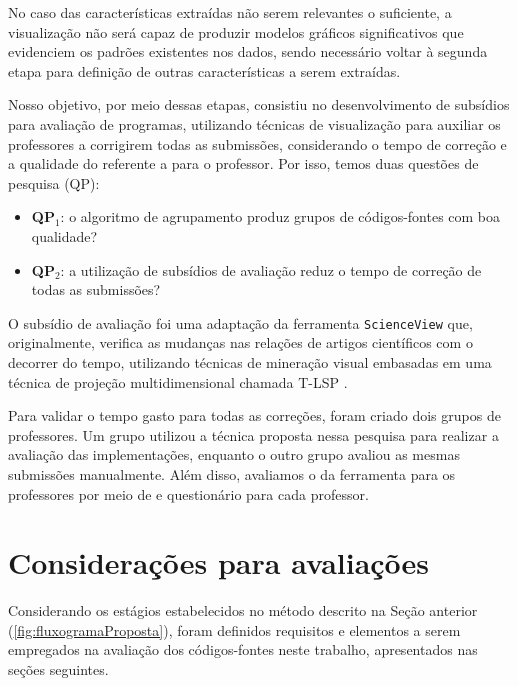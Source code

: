 	 	No caso das características extraídas não serem relevantes o suficiente, a
	 	visualização não será capaz de produzir modelos gráficos significativos que
	 	evidenciem os padrões existentes nos dados, sendo necessário voltar à segunda
	 	etapa para definição de outras características a serem extraídas.
	 	
	 	Nosso objetivo, por meio dessas etapas, consistiu no desenvolvimento de subsídios
	 	para avaliação de programas, utilizando técnicas de visualização para auxiliar os professores a
	 	corrigirem todas as submissões, considerando o tempo de correção e a qualidade do
	 	 referente a  para o professor.
	 	Por isso, temos duas questões de pesquisa (QP):
	 	
	 	\begin{itemize}
	 		\item \textbf{QP$_1$}: o algoritmo de agrupamento produz grupos de códigos-fontes
	 		com boa qualidade?
	 		\item \textbf{QP$_2$}: a utilização de subsídios de avaliação reduz o tempo
	 		de correção de todas as submissões?
	 	\end{itemize}
	 	
	 	O subsídio de avaliação foi uma adaptação da ferramenta \texttt{ScienceView}
	 	\cite{Alencar-etal:2012} que, originalmente, verifica as mudanças nas relações
	 	de artigos científicos com o decorrer do tempo, utilizando técnicas de mineração
	 	visual embasadas em uma técnica de projeção multidimensional chamada \acl{T-LSP}
	 	\cite{Alencar}.
	 	
	 	Para validar o tempo gasto para todas as correções, foram criado dois grupos de
	 	professores. Um grupo utilizou a técnica proposta nessa pesquisa para realizar
	 	a avaliação das implementações, enquanto o outro grupo avaliou as mesmas submissões
	 	manualmente. Além disso, avaliamos o  da ferramenta para os
	 	professores por meio de  e questionário para cada professor.
	 		
	\section{Considerações para avaliações}

		Considerando os estágios estabelecidos no método descrito na Seção anterior
		(\ref{fig:fluxogramaProposta}), foram definidos requisitos e elementos a serem
		empregados na avaliação dos códigos-fontes neste trabalho, apresentados
		nas seções seguintes.

